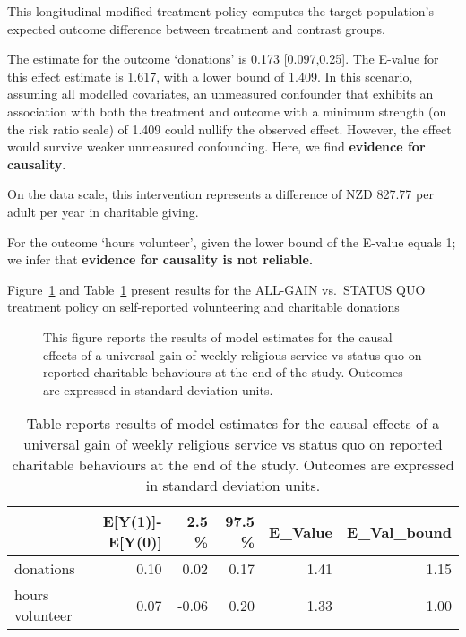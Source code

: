 \documentclass[
  singlecolumn]{article}
\begin{document}
This longitudinal modified treatment policy computes the target
population's expected outcome difference between treatment and contrast
groups.

The estimate for the outcome `donations' is 0.173 {[}0.097,0.25{]}. The
E-value for this effect estimate is 1.617, with a lower bound of 1.409.
In this scenario, assuming all modelled covariates, an unmeasured
confounder that exhibits an association with both the treatment and
outcome with a minimum strength (on the risk ratio scale) of 1.409 could
nullify the observed effect. However, the effect would survive weaker
unmeasured confounding. Here, we find \textbf{evidence for causality}.

On the data scale, this intervention represents a difference of NZD
827.77 per adult per year in charitable giving.

For the outcome `hours volunteer', given the lower bound of the E-value
equals 1; we infer that \textbf{evidence for causality is not reliable.}

\newpage{}

Figure~\ref{fig-1_2} and Table~\ref{tbl-1_2} present results for the
ALL-GAIN vs.~STATUS QUO treatment policy on self-reported volunteering
and charitable donations

\begin{figure}


\caption{\label{fig-1_2}This figure reports the results of model
estimates for the causal effects of a universal gain of weekly religious
service vs status quo on reported charitable behaviours at the end of
the study. Outcomes are expressed in standard deviation units.}

\end{figure}%

\begin{longtable}[]{@{}lrrrrr@{}}

\caption{\label{tbl-1_2}Table reports results of model estimates for the
causal effects of a universal gain of weekly religious service vs status
quo on reported charitable behaviours at the end of the study. Outcomes
are expressed in standard deviation units.}

\tabularnewline

\toprule\noalign{}
& E{[}Y(1){]}-E{[}Y(0){]} & 2.5 \% & 97.5 \% & E\_Value &
E\_Val\_bound \\
\midrule\noalign{}
\endhead
\bottomrule\noalign{}
\endlastfoot
donations & 0.10 & 0.02 & 0.17 & 1.41 & 1.15 \\
hours volunteer & 0.07 & -0.06 & 0.20 & 1.33 & 1.00 \\

\end{longtable}
\end{document}
